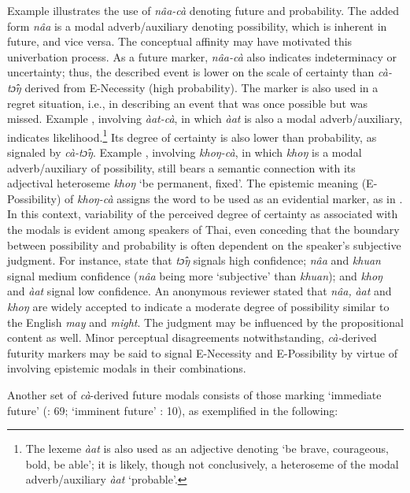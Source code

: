 \documentclass[output=paper,colorlinks,citecolor=brown]{langscibook}
\begin{document}
Example  illustrates the use of \textit{nâa-cà} denoting future and probability. The added form \textit{nâa} is a modal adverb/auxiliary denoting possibility, which is inherent in future, and vice versa. The conceptual affinity may have motivated this univerbation process. As a future marker, \textit{nâa-cà} also indicates indeterminacy or uncertainty; thus, the described event is lower on the scale of certainty than \textit{cà-tɔ̂ŋ }derived from E-Necessity (high probability). The marker is also used in a regret situation, i.e., in describing an event that was once possible but was missed. Example , involving \textit{àat-cà}, in which \textit{àat }is also a modal adverb/auxiliary, indicates likelihood.\footnote{The lexeme \textit{àat} is also used as an adjective denoting ‘be brave, courageous, bold, be able’; it is likely, though not conclusively, a heteroseme of the modal adverb/auxiliary \textit{àat} ‘probable’.} Its degree of certainty is also lower than probability, as signaled by \textit{cà-tɔ̂ŋ}. Example , involving \textit{khoŋ-cà}, in which \textit{khoŋ} is a modal adverb/auxiliary of possibility, still bears a semantic connection with its adjectival heteroseme \textit{khoŋ} ‘be permanent, fixed’. The epistemic meaning (E-Possibility) of \textit{khoŋ-cà} assigns the word to be used as an evidential marker, as in . In this context, variability of the perceived degree of certainty as associated with the modals is evident among speakers of Thai, even conceding that the boundary between possibility and probability is often dependent on the speaker’s subjective judgment. For instance, \citet[137]{IwasakiIngkaphirom2005} state that \textit{tɔ̂ŋ }signals high confidence; \textit{nâa }and \textit{khuan }signal medium confidence (\textit{nâa }being more ‘subjective’ than \textit{khuan}); and \textit{khoŋ }and \textit{àat }signal low confidence. An anonymous reviewer stated that \textit{nâa,} \textit{àat }and \textit{khoŋ }are widely accepted to indicate a moderate degree of possibility similar to the English \textit{may} and \textit{might}. The judgment may be influenced by the propositional content as well. Minor perceptual disagreements notwithstanding, \textit{cà-}derived futurity markers may be said to signal E-Necessity and E-Possibility by virtue of involving epistemic modals in their combinations. 

\largerpage[1]

Another set of \textit{cà}-derived future modals consists of those marking ‘immediate future’ (\cite{Smyth2002}: 69; ‘imminent future’ \cite{HeineKutevaNarrog2017}: 10), as exemplified in the following: 
\end{document}

